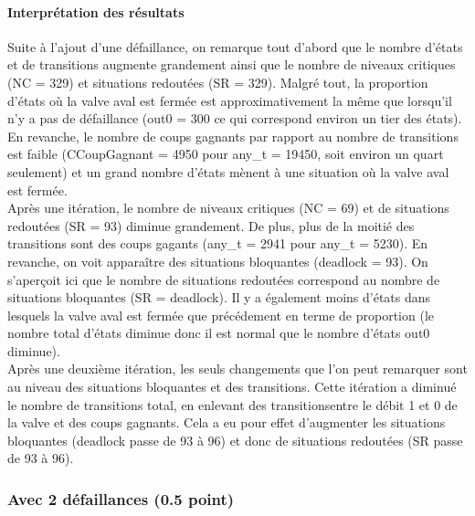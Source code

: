 \documentclass[a4paper]{book}
\begin{document}
\paragraph{Interprétation des résultats}
Suite à l'ajout d'une défaillance, on remarque tout d'abord que le nombre d'états et de transitions augmente grandement ainsi que le nombre 
de niveaux critiques (NC = 329) et situations redoutées (SR = 329). Malgré tout, la proportion d'états où la valve aval est fermée est approximativement 
la même que lorsqu'il n'y a pas de défaillance (out0 = 300 ce qui correspond environ un tier des états). En revanche, le nombre de coups gagnants par rapport 
au nombre de transitions est faible (CCoupGagnant = 4950 pour any\_t = 19450, soit environ un quart seulement) et un grand nombre d'états mènent à une situation où 
la valve aval est fermée. \\
Après une itération, le nombre de niveaux critiques (NC = 69) et de situations redoutées (SR = 93) diminue grandement. De plus, plus de la moitié des transitions 
sont des coups gagants (any\_t = 2941 pour any\_t = 5230). En revanche, on voit apparaître des situations bloquantes (deadlock = 93). On s'aperçoit ici que le nombre 
de situations redoutées correspond au nombre de situations bloquantes (SR = deadlock). Il y a également moins 
d'états dans lesquels la valve aval est fermée que précédement en terme de proportion (le nombre total d'états diminue donc il est normal que le nombre d'états out0 
diminue).\\
Après une deuxième itération, les seuls changements que l'on peut remarquer sont au niveau des situations bloquantes et des transitions. Cette itération a diminué 
le nombre de transitions total, en enlevant des transitionsentre le débit 1 et 0 de la valve et des coups gagnants. Cela a eu pour  
effet d'augmenter les situations bloquantes (deadlock passe de 93 à 96) et donc de situations redoutées (SR passe de 93 à 96).



\subsubsection{Avec 2 défaillances (0.5 point)}





\end{document}
